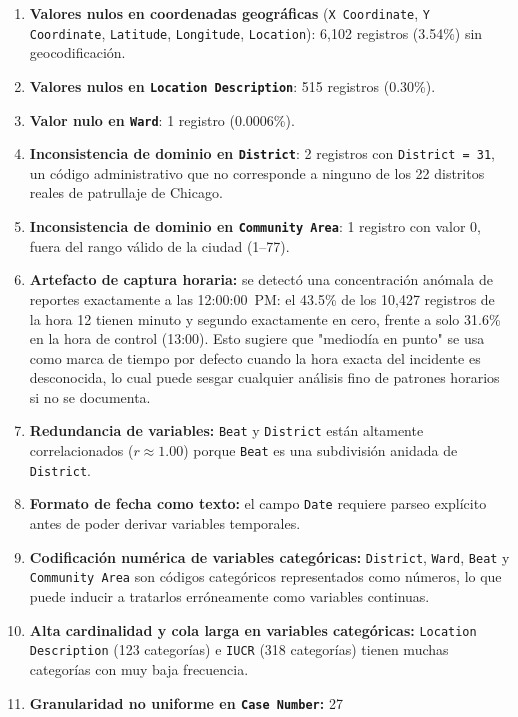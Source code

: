 \documentclass[11pt,a4paper]{article}
\begin{document}
\begin{enumerate}
    \item \textbf{Valores nulos en coordenadas geográficas}
    (\texttt{X Coordinate}, \texttt{Y Coordinate}, \texttt{Latitude},
    \texttt{Longitude}, \texttt{Location}): 6,102 registros (3.54\%) sin
    geocodificación.
    \item \textbf{Valores nulos en \texttt{Location Description}}: 515
    registros (0.30\%).
    \item \textbf{Valor nulo en \texttt{Ward}}: 1 registro (0.0006\%).
    \item \textbf{Inconsistencia de dominio en \texttt{District}}: 2
    registros con \texttt{District = 31}, un código administrativo que no
    corresponde a ninguno de los 22 distritos reales de patrullaje de
    Chicago.
    \item \textbf{Inconsistencia de dominio en \texttt{Community Area}}: 1
    registro con valor 0, fuera del rango válido de la ciudad (1--77).
    \item \textbf{Artefacto de captura horaria:} se detectó una
    concentración anómala de reportes exactamente a las 12:00:00~PM: el
    43.5\% de los 10,427 registros de la hora 12 tienen minuto y segundo
    exactamente en cero, frente a solo 31.6\% en la hora de control (13:00).
    Esto sugiere que "mediodía en punto" se usa como marca de tiempo por
    defecto cuando la hora exacta del incidente es desconocida, lo cual
    puede sesgar cualquier análisis fino de patrones horarios si no se
    documenta.
    \item \textbf{Redundancia de variables:} \texttt{Beat} y
    \texttt{District} están altamente correlacionados ($r\approx 1.00$)
    porque \texttt{Beat} es una subdivisión anidada de \texttt{District}.
    \item \textbf{Formato de fecha como texto:} el campo \texttt{Date}
    requiere parseo explícito antes de poder derivar variables temporales.
    \item \textbf{Codificación numérica de variables categóricas:}
    \texttt{District}, \texttt{Ward}, \texttt{Beat} y
    \texttt{Community Area} son códigos categóricos representados como
    números, lo que puede inducir a tratarlos erróneamente como variables
    continuas.
    \item \textbf{Alta cardinalidad y cola larga en variables categóricas:}
    \texttt{Location Description} (123 categorías) e \texttt{IUCR} (318
    categorías) tienen muchas categorías con muy baja frecuencia.
    \item \textbf{Granularidad no uniforme en \texttt{Case Number}:} 27

\end{enumerate}
\end{document}
